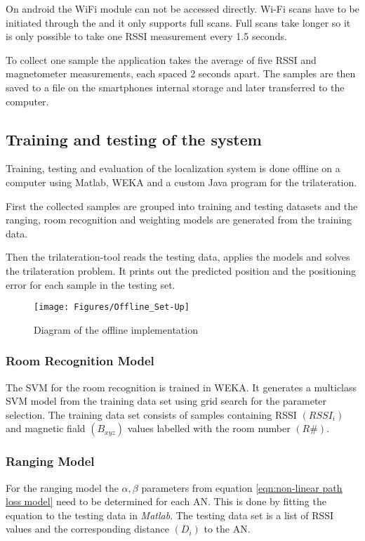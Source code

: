 On android the WiFi module can not be accessed directly. Wi-Fi scans have to be initiated through the  and it only supports full scans\cite{brouwers2014incremental}. Full scans take longer so it is only possible to take one RSSI measurement every 1.5 seconds.

To collect one sample the application takes the average of five RSSI and magnetometer measurements, each spaced 2 seconds apart. The samples are then saved to a  file on the smartphones internal storage and later transferred to the computer.

\subsection{Training and testing of the system}

Training, testing and evaluation of the localization system is done offline on a computer using Matlab, WEKA and a custom Java program for the trilateration.

First the collected samples are grouped into training and testing datasets and the ranging, room recognition and weighting models are generated from the training data.

Then the trilateration-tool reads the testing data, applies the models and solves the trilateration problem. It prints out the predicted position and the positioning error for each sample in the testing set.

\begin{figure}[ht]
\centering
\texttt{[image: Figures/Offline\_Set-Up]}
\decoRule
\caption[Offline implementation]{Diagram of the offline implementation}
\label{fig:offlineImplementation}
\end{figure}

\subsubsection*{Room Recognition Model}
The SVM for the room recognition is trained in WEKA. It generates a multiclass SVM model from the training data set using grid search for the parameter selection. The training data set consists of samples containing RSSI \((RSSI_{i})\) and magnetic fiald \((B_{xyz})\) values labelled with the room number \((R\#)\).

\subsubsection*{Ranging Model}
For the ranging model the \(\alpha, \beta\) parameters from equation \ref{eqn:non-linear path loss model} need to be determined for each AN. This is done by fitting the equation to the testing data in \emph{Matlab}. The testing data set is a list of RSSI values and the corresponding distance \((D_{i})\) to the AN.

